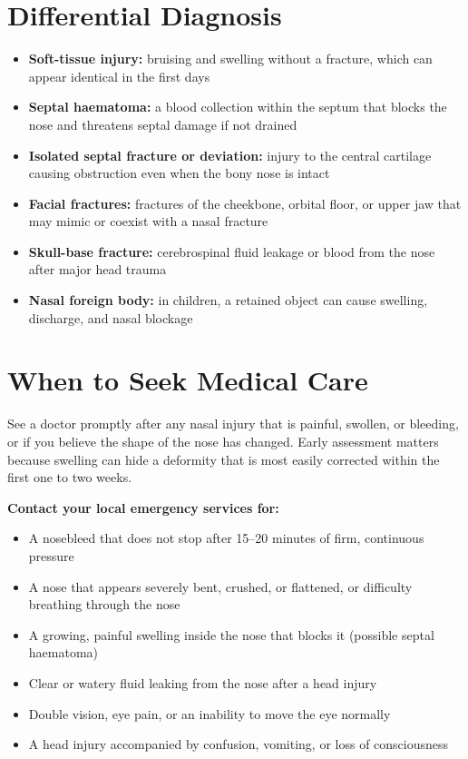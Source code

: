 \section*{Differential Diagnosis}
\begin{itemize}
    \item \textbf{Soft-tissue injury:} bruising and swelling without a fracture, which can appear identical in the first days
    \item \textbf{Septal haematoma:} a blood collection within the septum that blocks the nose and threatens septal damage if not drained
    \item \textbf{Isolated septal fracture or deviation:} injury to the central cartilage causing obstruction even when the bony nose is intact
    \item \textbf{Facial fractures:} fractures of the cheekbone, orbital floor, or upper jaw that may mimic or coexist with a nasal fracture
    \item \textbf{Skull-base fracture:} cerebrospinal fluid leakage or blood from the nose after major head trauma
    \item \textbf{Nasal foreign body:} in children, a retained object can cause swelling, discharge, and nasal blockage
\end{itemize}

\section*{When to Seek Medical Care}
See a doctor promptly after any nasal injury that is painful, swollen, or bleeding, or if you believe the shape of the nose has changed. Early assessment matters because swelling can hide a deformity that is most easily corrected within the first one to two weeks.

\textbf{Contact your local emergency services for:}
\begin{itemize}
    \item A nosebleed that does not stop after 15--20 minutes of firm, continuous pressure
    \item A nose that appears severely bent, crushed, or flattened, or difficulty breathing through the nose
    \item A growing, painful swelling inside the nose that blocks it (possible septal haematoma)
    \item Clear or watery fluid leaking from the nose after a head injury
    \item Double vision, eye pain, or an inability to move the eye normally
    \item A head injury accompanied by confusion, vomiting, or loss of consciousness
\end{itemize}

